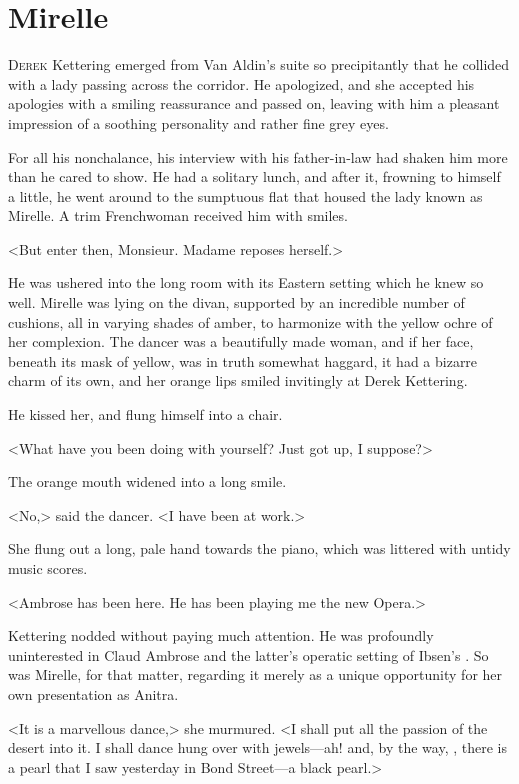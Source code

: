 \chapter{Mirelle}



\lettrine{D}{erek} Kettering emerged from Van Aldin's suite so precipitantly that he collided with a lady passing across the corridor. He apologized, and she accepted his apologies with a smiling reassurance and passed on, leaving with him a pleasant impression of a soothing personality and rather fine grey eyes.

For all his nonchalance, his interview with his father-in-law had shaken him more than he cared to show. He had a solitary lunch, and after it, frowning to himself a little, he went around to the sumptuous flat that housed the lady known as Mirelle. A trim Frenchwoman received him with smiles.

<But enter then, Monsieur. Madame reposes herself.>

He was ushered into the long room with its Eastern setting which he knew so well. Mirelle was lying on the divan, supported by an incredible number of cushions, all in varying shades of amber, to harmonize with the yellow ochre of her complexion. The dancer was a beautifully made woman, and if her face, beneath its mask of yellow, was in truth somewhat haggard, it had a bizarre charm of its own, and her orange lips smiled invitingly at Derek Kettering.

He kissed her, and flung himself into a chair.

<What have you been doing with yourself? Just got up, I suppose?>

The orange mouth widened into a long smile.

<No,> said the dancer. <I have been at work.>

She flung out a long, pale hand towards the piano, which was littered with untidy music scores.

<Ambrose has been here. He has been playing me the new Opera.>

Kettering nodded without paying much attention. He was profoundly uninterested in Claud Ambrose and the latter's operatic setting of Ibsen's . So was Mirelle, for that matter, regarding it merely as a unique opportunity for her own presentation as Anitra.

<It is a marvellous dance,> she murmured. <I shall put all the passion of the desert into it. I shall dance hung over with jewels—ah! and, by the way, , there is a pearl that I saw yesterday in Bond Street—a black pearl.>

